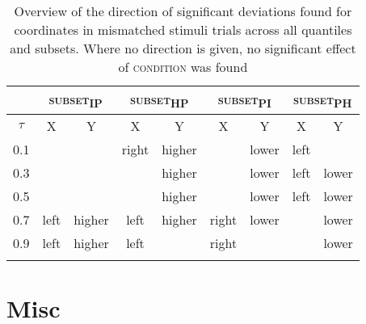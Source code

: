 \begin{table}[H]\fontsize{10}{11}
\caption{Overview of the direction of significant deviations found for coordinates in mismatched stimuli trials across all quantiles and subsets. Where no direction is given, no significant effect of \textsc{condition} was found}
\label{tab:8.10}
\centering
\begin{tabular}{ccccccccc}
\lsptoprule
\multirow{2}{*}{~} & 
\multicolumn{2}{c}{\textsc{subset\textsubscript{IP}}} & 
\multicolumn{2}{c}{\textsc{subset\textsubscript{HP}}} & 
\multicolumn{2}{c}{\textsc{subset\textsubscript{PI}}} & 
\multicolumn{2}{c}{\textsc{subset\textsubscript{PH}}}  \\
\midrule
                                   $\tau$    & X    & Y                     & X     & Y                    & X     & Y                    & X    & Y                      \\
                                       \midrule
0.1                                    & ~    & ~                     & right & higher               & ~     & lower                & left & ~                      \\
0.3                                    & ~    & ~                     & ~     & higher               & ~     & lower                & left & lower                  \\
0.5                                    & ~    & ~                     & ~     & higher               & ~     & lower                & left & lower                  \\
0.7                                    & left & higher                & left  & higher               & right & lower                & ~    & lower                  \\
0.9                                    & left & higher                & left  & ~                    & right & ~                    & ~    & lower     \\
\lspbottomrule
\end{tabular}
\end{table}



\section{Misc}

